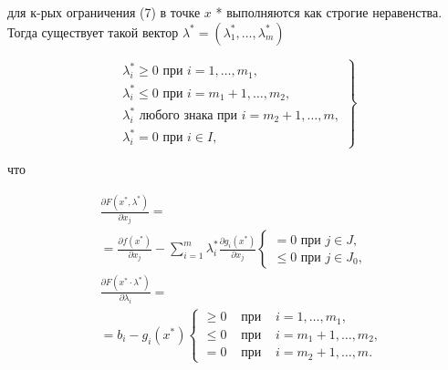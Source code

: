 \documentclass[10pt]{article}
\begin{document}
для к-рых ограничения (7) в точке $x$ * выполняются как строгие неравенства. Тогда существует такой вектор $\lambda^{*}=\left(\lambda_{1}^{*}, \ldots, \lambda_{m}^{*}\right)$



\[

\left.\begin{array}{c}

\lambda_{i}^{*} \geqslant 0 \text { при } i=1, \ldots, m_{1}, \\

\lambda_{i}^{*} \leqslant 0 \text { при } i=m_{1}+1, \ldots, m_{2}, \\

\lambda_{i}^{*} \text { любого знака при } i=m_{2}+1, \ldots, m, \\

\lambda_{i}^{*}=0 \text { при } i \in I,

\end{array}\right\}

\]



что



\[

\begin{aligned}

& \frac{\partial F\left(x^{*}, \lambda^{*}\right)}{\partial x_{j}}= \\

& =\frac{\partial f\left(x^{*}\right)}{\partial x_{j}}-\sum_{i=1}^{m} \lambda_{i}^{*} \frac{\partial g_{i}\left(x^{*}\right)}{\partial x_{j}}\left\{\begin{array}{l}

=0 \text { при } j \in J, \\

\leqslant 0 \text { при } j \in J_{0},

\end{array}\right. \\

& \frac{\partial F\left(x^{*} \cdot \lambda^{*}\right)}{\partial \lambda_{i}}= \\

& =b_{i}-g_{i}\left(x^{*}\right)\left\{\begin{array}{lll}

\geqslant 0 & \text { при } & i=1, \ldots, m_{1}, \\

\leqslant 0 & \text { при } & i=m_{1}+1, \ldots, m_{2}, \\

=0 & \text { при } & i=m_{2}+1, \ldots, m .

\end{array}\right.

\end{aligned}

\]
\end{document}
